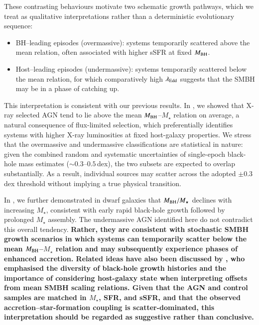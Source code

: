 \documentclass{aa}
\begin{document}
These contrasting behaviours motivate two schematic growth pathways, which we treat as qualitative interpretations rather than a deterministic evolutionary sequence:
\begin{itemize}
\item BH--leading episodes (overmassive):
  systems temporarily scattered above the mean relation, often associated with higher sSFR at fixed $M_{\rm BH}$.

\item Host--leading episodes (undermassive):
  systems temporarily scattered below the mean relation, for which comparatively high $\lambda_{\rm Edd}$ suggests that the SMBH may be in a phase of catching up.
\end{itemize}

This interpretation is consistent with our previous results. In \citet{Mountrichas2023b}, we showed that X-ray selected AGN tend to lie above the mean $M_{\rm BH}$--$M_\star$ relation on average, a natural consequence of flux-limited selection, which preferentially identifies systems with higher X-ray luminosities at fixed host-galaxy properties. We stress that the overmassive and undermassive classifications are statistical in nature: given the combined random and systematic uncertainties of single-epoch black-hole mass estimates ($\sim0.3$--$0.5$\,dex), the two subsets are expected to overlap substantially. As a result, individual sources may scatter across the adopted $\pm0.3$\,dex threshold without implying a true physical transition.

In \citet{Mountrichas2025a}, we further demonstrated in dwarf galaxies that $M_{\rm BH}/M_\star$ declines with increasing $M_\star$, consistent with early rapid black-hole growth followed by prolonged $M_\star$ assembly. The undermassive AGN identified here do not contradict this overall tendency. \textbf{Rather, they are consistent with stochastic SMBH growth scenarios in which systems can temporarily scatter below the mean $M_{\rm BH}$--$M_\star$ relation and may subsequently experience phases of enhanced accretion. Related ideas have also been discussed by \citet{Terrazas2025} \citep[see also][]{Roberts2026}, who emphasised the diversity of black-hole growth histories and the importance of considering host-galaxy state when interpreting offsets from mean SMBH scaling relations. Given that the AGN and control samples are matched in $M_\star$, SFR, and sSFR, and that the observed accretion--star-formation coupling is scatter-dominated, this interpretation should be regarded as suggestive rather than conclusive.}
\end{document}
